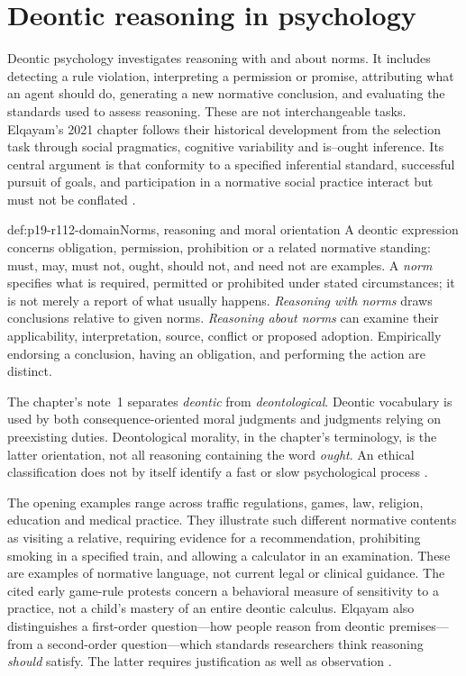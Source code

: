 \chapter{Deontic reasoning in psychology}
\label{sec:p19-rationality-11-2}

Deontic psychology investigates reasoning with and about norms. It includes
detecting a rule violation, interpreting a permission or promise, attributing
what an agent should do, generating a new normative conclusion, and evaluating
the standards used to assess reasoning. These are not interchangeable tasks.
Elqayam's 2021 chapter follows their historical development from the selection
task through social pragmatics, cognitive variability and is--ought inference.
Its central argument is that conformity to a specified inferential standard,
successful pursuit of goals, and participation in a normative social practice
interact but must not be conflated
\cite[pp.~651--655]{Elqayam2021DeonticPsychology}.

\begin{hbdefinition}{def:p19-r112-domain}{Norms, reasoning and moral orientation}
A deontic expression concerns obligation, permission, prohibition or a related
normative standing: must, may, must not, ought, should not, and need not are
examples. A \emph{norm} specifies what is required, permitted or prohibited
under stated circumstances; it is not merely a report of what usually happens.
\emph{Reasoning with norms} draws conclusions relative to given norms.
\emph{Reasoning about norms} can examine their applicability, interpretation,
source, conflict or proposed adoption. Empirically endorsing a conclusion,
having an obligation, and performing the action are distinct.

The chapter's note~1 separates \emph{deontic} from \emph{deontological}.
Deontic vocabulary is used by both consequence-oriented moral judgments and
judgments relying on preexisting duties. Deontological morality, in the
chapter's terminology, is the latter orientation, not all reasoning containing
the word \emph{ought}. An ethical classification does not by itself identify
a fast or slow psychological process
\cite[pp.~651,655, note~1]{Elqayam2021DeonticPsychology}.
\end{hbdefinition}

The opening examples range across traffic regulations, games, law, religion,
education and medical practice. They illustrate such different normative
contents as visiting a relative, requiring evidence for a recommendation,
prohibiting smoking in a specified train, and allowing a calculator in an
examination. These are examples of normative language, not current legal or
clinical guidance. The cited early game-rule protests concern a behavioral
measure of sensitivity to a practice, not a child's mastery of an entire
deontic calculus. Elqayam also distinguishes a first-order question---how
people reason from deontic premises---from a second-order question---which
standards researchers think reasoning \emph{should} satisfy. The latter
requires justification as well as observation
\cite[p.~651]{Elqayam2021DeonticPsychology}.

